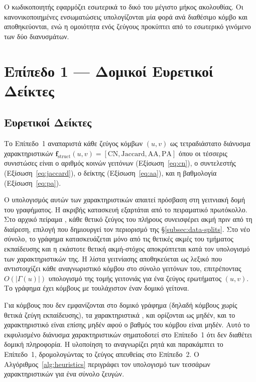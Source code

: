 Ο κωδικοποιητής  εφαρμόζει εσωτερικά το δικό του μέγιστο
μήκος ακολουθίας.
Οι κανονικοποιημένες ενσωματώσεις υπολογίζονται μία φορά ανά
διαθέσιμο κόμβο και αποθηκεύονται, ενώ η ομοιότητα ενός ζεύγους προκύπτει από το
εσωτερικό γινόμενο των δύο διανυσμάτων.


\section{Επίπεδο 1 --- Δομικοί Ευρετικοί Δείκτες}
\label{sec:level1-heuristics}

\subsection{Ευρετικοί Δείκτες}
\label{subsec:heuristic-features}

Το Επίπεδο~1 αναπαριστά κάθε ζεύγος κόμβων $(u, v)$ ως τετραδιάστατο διάνυσμα
χαρακτηριστικών $\mathbf{f}_{\text{struct}}(u, v) = [\mathrm{CN}, \mathrm{Jaccard},
\mathrm{AA}, \mathrm{PA}]$ όπου οι τέσσερις συνιστώσες είναι ο αριθμός κοινών
γειτόνων (Εξίσωση~\ref{eq:cn}), ο συντελεστής  (Εξίσωση~\ref{eq:jaccard}),
ο δείκτης  (Εξίσωση~\ref{eq:aa}), και η βαθμολογία  (Εξίσωση~\ref{eq:pa}).

Ο υπολογισμός αυτών των χαρακτηριστικών απαιτεί πρόσβαση στη γειτνιακή δομή του
γραφήματος.
Η ακριβής κατασκευή εξαρτάται από το πειραματικό πρωτόκολλο.
Στο αρχικό πείραμα
, κάθε θετικό ζεύγος του πλήρους \texttt{} συνεισφέρει
ακμή πριν από τη διαίρεση, επιλογή που δημιουργεί τον περιορισμό της
\S\ref{subsec:data-splits}.
Στο νέο σύνολο, το γράφημα κατασκευάζεται μόνο από
τις θετικές ακμές του τμήματος εκπαίδευσης και η εκάστοτε θετική ακμή-στόχος
αποκρύπτεται κατά τον υπολογισμό των χαρακτηριστικών της.
Η λίστα γειτνίασης αποθηκεύεται ως λεξικό που αντιστοιχίζει κάθε αναγνωριστικό
κόμβου στο σύνολο γειτόνων του, επιτρέποντας $O(|\Gamma(u)|)$ υπολογισμό της τομής
γειτονιάς για ένα ζεύγος ερωτήματος $(u, v)$.
Το γράφημα έχει \GraphNodes{} κόμβους με
τουλάχιστον έναν δομικό γείτονα.

Για κόμβους που δεν εμφανίζονται στο δομικό γράφημα (δηλαδή κόμβους χωρίς θετικά
ζεύγη εκπαίδευσης), τα χαρακτηριστικά ,  και  ορίζονται ως μηδέν, και το
χαρακτηριστικό  είναι επίσης μηδέν αφού ο βαθμός του κόμβου είναι μηδέν.
Αυτό το
εκφυλισμένο διάνυσμα χαρακτηριστικών σηματοδοτεί στο Επίπεδο~1 ότι δεν διαθέτει
δομική πληροφορία.
Η υλοποίηση το αναγνωρίζει ρητά και παρακάμπτει το Επίπεδο~1,
δρομολογώντας το ζεύγος απευθείας στο Επίπεδο~2.
Ο Αλγόριθμος~\ref{alg:heuristics} περιγράφει
τον υπολογισμό των τεσσάρων χαρακτηριστικών για ένα σύνολο ζευγών.

